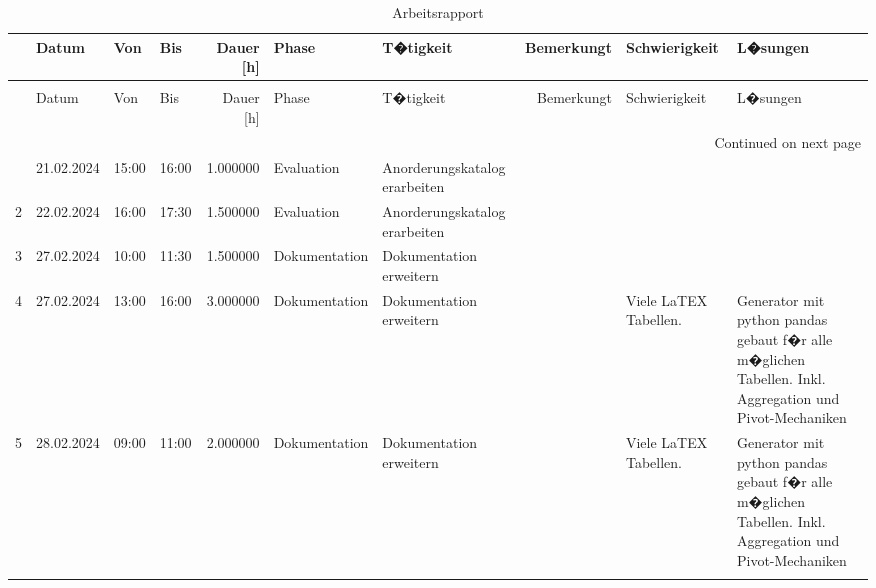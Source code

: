 \begin{longtable}[H]{llllrllrll}

\toprule
 & Datum & Von & Bis & Dauer [h] & Phase & T�tigkeit & Bemerkungt & Schwierigkeit & L�sungen \\
\midrule
\endfirsthead
\caption[]{Arbeitsrapport} \\
\toprule
 & Datum & Von & Bis & Dauer [h] & Phase & T�tigkeit & Bemerkungt & Schwierigkeit & L�sungen \\
\midrule
\endhead
\midrule
\multicolumn{10}{r}{Continued on next page} \\
\midrule
\endfoot
\bottomrule
\endlastfoot
1 & 21.02.2024 & 15:00 & 16:00 & 1.000000 & Evaluation & Anorderungskatalog erarbeiten &  &  &  \\
2 & 22.02.2024 & 16:00 & 17:30 & 1.500000 & Evaluation & Anorderungskatalog erarbeiten &  &  &  \\
3 & 27.02.2024 & 10:00 & 11:30 & 1.500000 & Dokumentation & Dokumentation erweitern &  &  &  \\
4 & 27.02.2024 & 13:00 & 16:00 & 3.000000 & Dokumentation & Dokumentation erweitern &  & Viele LaTEX Tabellen. & Generator mit python pandas gebaut f�r alle m�glichen Tabellen. Inkl. Aggregation und Pivot-Mechaniken \\
5 & 28.02.2024 & 09:00 & 11:00 & 2.000000 & Dokumentation & Dokumentation erweitern &  & Viele LaTEX Tabellen. & Generator mit python pandas gebaut f�r alle m�glichen Tabellen. Inkl. Aggregation und Pivot-Mechaniken \\
\caption{Arbeitsrapport} \label{arbeitsrapport}
\end{longtable}
